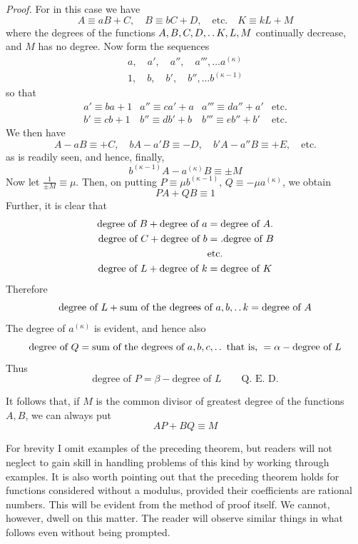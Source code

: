 \emph{Proof.} For in this case we have
\[
A\equiv aB+C,\quad B\equiv bC+D,\quad\text{etc.}\quad K\equiv kL+M
\]
where the degrees of the functions $A,B,C,D,\mathinner{.\,.} K,L,M$ continually decrease, and $M$ has no degree. Now form the sequences
\[
\begin{gathered}
a,\quad a',\quad a'',\quad a''',\ldots a^{(\kappa)}\\
1,\quad b,\quad b',\quad b'',\ldots b^{(\kappa-1)}
\end{gathered}
\]
so that
\[
\begin{array}{llll}
a'\equiv ba+1&a''\equiv ca'+a&a'''\equiv da''+a'&\text{etc.}\\
b'\equiv cb+1&b''\equiv db'+b&b'''\equiv eb''+b'&\text{etc.}
\end{array}
\]
We then have
\[
A-aB\equiv+C,\quad bA-a'B\equiv-D,\quad b'A-a''B\equiv+E,\quad\text{etc.}
\]
as is readily seen, and hence, finally,
\[
b^{(\kappa-1)}A-a^{(\kappa)}B\equiv\pm M
\]
Now let $\frac1{\pm M}\equiv\mu$. Then, on putting $P\equiv\mu b^{(\kappa-1)}$, $Q\equiv-\mu a^{(\kappa)}$, we obtain
\[
PA+QB\equiv1
\]
Further, it is clear that
\[
\begin{aligned}
\text{degree of }B+\text{degree of }a&=\text{degree of }A.\\
\text{degree of }C+\text{degree of }b&=\mathbin{.}\text{degree of }B\\
&\text{etc.}\\
\text{degree of }L+\text{degree of }k&=\text{degree of }K
\end{aligned}
\]
Therefore
\[
\text{degree of }L+\text{sum of the degrees of }a,b,\mathinner{.\,.} k=\text{degree of }A
\]
The degree of $a^{(\kappa)}$ is evident, and hence also
\[
\text{degree of }Q=\text{sum of the degrees of }a,b,c,\mathinner{.\,.}\text{ that is, }=\alpha-\text{degree of }L
\]
Thus
\[
\text{degree of }P=\beta-\text{degree of }L\qquad\text{Q. E. D.}
\]

It follows that, if $M$ is the common divisor of greatest degree of the functions $A,B$, we can always put
\[
AP+BQ\equiv M
\]

For brevity I omit examples of the preceding theorem, but readers will not neglect to gain skill in handling problems of this kind by working through examples. It is also worth pointing out that the preceding theorem holds for functions considered without a modulus, provided their coefficients are rational numbers. This will be evident from the method of proof itself. We cannot, however, dwell on this matter. The reader will observe similar things in what follows even without being prompted.

